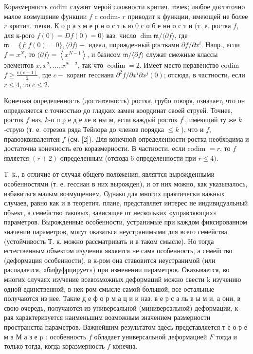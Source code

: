 \documentclass[10pt]{article}
\begin{document}
Коразмерность codim служит мерой сложности критич. точек; любое достаточно малое возмущение функции $f$ c codim- $r$ приводит к функции, имеющей не более $r$ критич. точки. К о р а з м е р н о с т ь ю 0 с о б е нн о с т и (т. е. ростка $f$, для к-рого $f(0)=D f(0)=0)$ ваз. число $\operatorname{dim} \mathfrak{m} /\langle\partial f\rangle$, где $\mathfrak{m}=\{f: f(0)=0\},\langle\partial f\rangle-$ идеал, порожденный ростками $\partial f / \partial x^{i}$. Напр., если $f=x^{N}$, то $\langle\partial f\rangle=\left\langle x^{N-1}\right\rangle$, и базисом $\mathfrak{m} /\langle\partial f\rangle$ служат смежные классы элементов $x, x^{2}, \ldots, x^{N-2}$, так что $\operatorname{codim}=2$. Имеет место неравенство codim $f \geqslant \frac{c(c+1)}{2}$, где $c-$ коранг гессиана $\partial^{2} f / \partial x^{i} \partial x^{j}(0)$; отсюда, в частности, если $r \leqslant 4$, то $c \leqslant 2$.



Конечная определенность (достаточность) ростка, грубо говоря, означает, что он определяется с точностью до гладких замен координат своей струей. Точнее, росток $f$ наз. $k$-о п р е д е ле в ны м, если каждый росток $f^{\prime}$, имеющий ту же $k$-струю (т. е. отрезок ряда Тейлора до членов порядка $\leqslant k$ ), что и $f$, правоэквивалентен $f$ (см. [2]). Для конечной определенности ростка необходима и достаточна конечность его коразмерности. В частности, если codim $=r$, то $f$ является $(r+2)$-определенным (отсюда 6-определенности при $r \leqslant 4)$.



Т. к., в отличие от случая общего положения, являгтся вырожденными особенностями (т. е. гессиан в них вырожден), и от них можно, как указывалось, избавиться малым возмущением. Однако для многих практически важных случаев, равно как и в теоретич. плане, представляет интерес не индивидуальный объект, а семейство таковых, зависящее от нескольких «управляющих» параметров. Вырожденные особенности, устранимые при каждом фиксированном значении параметров, могут оказаться неустранимыми для всего семейства (устойчивость Т. к. можно рассматривать и в таком смысле). Но тогда естественным объектом изучения является не сама особенность, а семейство (деформация особенности), в к-ром она ставовится неустранимой (или распадается, «бифуфрцирует») при изменении параметров. Оказывается, во многих случаях изучение всевозможных деформаций можно свести $\mathrm{k}$ изучению одной единственной, в нек-ром смысле самой большой, все остальные получаются из нее. Такие д е ф о р м а ц и и наз. в е р с а ль в ы м и, а они, в свою очередь, получаются из универсальной (миниверсальной) деформации, к-рая характеризуется наименьшим возможным значением размерности пространства параметров. Важнейшим результатом здесь представляется т е о р е м а М а з е $\mathrm{p}$ : особенность $f$ обладает универсальной деформацией $F$ тогда и только тогда, когда коразмерность $f$ конечна.
\end{document}
